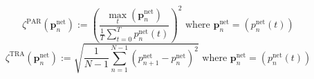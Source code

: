 \begin{equation}
	\zeta^\text{PAR}(\textbf{p}^\text{net}_n) := \left(\frac{\max_t(\textbf{p}^\text{net}_n)}{\frac{1}{T}\sum_{t=0}^{T}p^\text{net}_n(t)}\right)^2 \text{ where } \textbf{p}^\text{net}_n = (p^\text{net}_n(t))
	\label{ch3:equ:performance-metrics-par}
\end{equation}
\begin{equation}
	\zeta^\text{TRA}(\textbf{p}^\text{net}_n) := \sqrt{\frac{1}{N-1}\sum_{n=1}^{N-1}(p^\text{net}_{n+1}-p^\text{net}_n)^2} \text{ where } \textbf{p}^\text{net}_n = (p^\text{net}_n(t))
	\label{ch3:equ:performance-metrics-tra}
\end{equation}